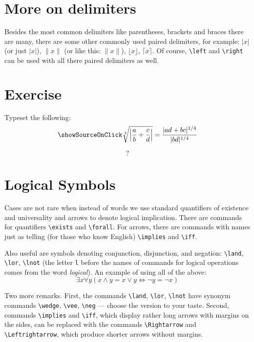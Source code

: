 \section{More on delimiters}
\par Besides the most common delimiters like parentheses, brackets and braces there are many, there are some other commonly used paired delimiters, for example: \( \lvert x \rvert \) (or just \( |x| \)), \( \lVert x \rVert \) (or like this: \( \| x \| \)), \( \lfloor x \rfloor \), \( \lceil x \rceil\). Of course, \verb"\left" and \verb"\right" can be used with all there paired delimiters as well.

\section{Exercise}
\begin{staticpart}
Typeset the following: \[\showSourceOnClick \sqrt[4]{\left\lvert\frac{a}{b}+\frac{c}{d}\right\rvert}=\frac{|ad+bc|^{1/4}}{|bd|^{1/4}}\]
\end{staticpart}
\[?\]

\section{Logical Symbols}
\par Cases are not rare when instead of words we use standard quantifiers of existence and universality and arrows to denote logical implication. There are commands for quantifiers \verb"\exists" and \verb"\forall". For arrows, there are commands with names just as telling (for those who know English) \verb"\implies" and \verb"\iff".
\par Also useful are symbols denoting conjunction, disjunction, and negation: \verb"\land", \verb"\lor", \verb"\lnot" (the letter \verb"l" before the names of commands for logical operations comes from the word \emph{logical}). An example of using all of the above: \[ \exists x \forall y (x\land y=x\lor y \iff \lnot y=\lnot x) \]
\par Two more remarks. First, the commands \verb"\land", \verb"\lor", \verb"\lnot" have synonym commands \verb"\wedge", \verb"\vee", \verb"\neg" --- choose the version to your taste. Second, commands \verb"\implies" and \verb"\iff", which display rather long arrows with margins on the sides, can be replaced with the commands \verb"\Rightarrow" and \verb"\Leftrightarrow", which produce shorter arrows without margins.\index{\Rightarrow,\Leftrightarrow}

